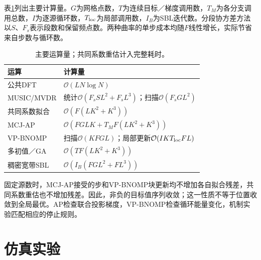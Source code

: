 \documentclass[a4paper,fleqn]{cas-sc}
\begin{document}
表\ref{en:complexity}列出主要计算量。$G$为网格点数，$T$为连续目标／梯度调用数，$T_M$为各分支调用总数，$I$为逐源循环数，$T_{\rm loc}$为局部调用数，$I_B$为SBL迭代数。分段协方差方法以$S$、$F_s$表示段数和保留频点数。两种曲率的单步成本均随$F$线性增长，实际节省来自步数与循环数。
\begin{table}[pos=H]\centering
\caption{主要运算量；共同系数重估计入完整耗时。}\label{en:complexity}
\begin{tabularx}{\linewidth}{@{}lX@{}}\toprule
运算 & 计算量\\\midrule
公共DFT & $\mathcal O(LN\log N)$\\
MUSIC/MVDR & 统计$\mathcal O(F_sSL^2+F_sL^3)$；扫描$\mathcal O(F_sGL^2)$\\
共同系数拟合 & $\mathcal O(F(LK^2+K^3))$\\
MCJ-AP & $\mathcal O(FGLK+T_MF(LK^2+K^3))$\\
VP-BNOMP & 扫描$\mathcal O(KFGL)$；局部更新$\mathcal O(IKT_{\rm loc}FL)$\\
多初值／GA & $\mathcal O(TF(LK^2+K^3))$\\
稠密宽带SBL & $\mathcal O(I_B(FGL^2+FL^3))$\\\bottomrule
\end{tabularx}\end{table}

固定源数时，MCJ-AP接受的步和VP-BNOMP块更新均不增加各自拟合残差，共同系数重估也不增加残差。因此，非负的目标值序列收敛；这一性质不等于位置收敛到全局最优。AP检查联合投影梯度，VP-BNOMP检查循环能量变化，机制实验匹配相应的停止规则。

\FloatBarrier
\section{仿真实验}
\FloatBarrier
\end{document}
